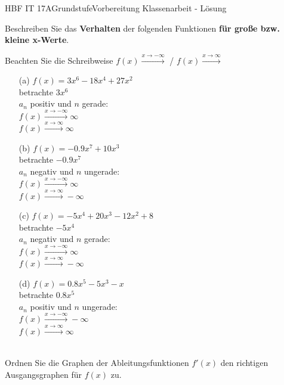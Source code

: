 \documentclass[oneside,openany,headings=optiontotoc,11pt,numbers=noenddot]{scrreprt}
\begin{document}
	\begin{worksheet}{HBF IT 17A}{Grundstufe}{Vorbereitung Klassenarbeit - Lösung}
		\begin{framed}
			\noindent\normalsize
			Beschreiben Sie das \textbf{Verhalten} der folgenden Funktionen \textbf{für große bzw. kleine x-Werte}.
			\begin{framed}
				Beachten Sie die Schreibweise \(f(x) \xrightarrow{x \rightarrow -\infty}\) / \(f(x) \xrightarrow{x \rightarrow \infty}\)
			\end{framed}
			\begin{itemize}
				\item[(a)] \(f(x) = 3x^6 -18x^4 +27x^2\)\\
				betrachte \(3x^6\)\\
				\(a_n\) positiv und \(n\) gerade:\\
				\(f(x) \xrightarrow{x \rightarrow -\infty} \infty\)\\
				\(f(x) \xrightarrow{x \rightarrow \infty} \infty\)
				\item[(b)] \(f(x) = -0.9x^7+10x^3\)\\
				betrachte \(-0.9x^7\)\\
				\(a_n\) negativ und \(n\) ungerade:\\
				\(f(x) \xrightarrow{x \rightarrow -\infty} \infty\)\\
				\(f(x) \xrightarrow{x \rightarrow \infty} -\infty\)
				\item[(c)] \(f(x) = -5x^4 +20x^3 -12x^2 +8\)\\
				betrachte \(-5x^4\)\\
				\(a_n\) negativ und \(n\) gerade:\\
				\(f(x) \xrightarrow{x \rightarrow -\infty} \infty\)\\
				\(f(x) \xrightarrow{x \rightarrow \infty} -\infty\)
				\item[(d)] \(f(x) = 0.8x^5-5x^3-x\)\\
				betrachte \(0.8x^5\)\\
				\(a_n\) positiv und \(n\) ungerade:\\
				\(f(x) \xrightarrow{x \rightarrow -\infty} -\infty\)\\
				\(f(x) \xrightarrow{x \rightarrow \infty} \infty\)
			\end{itemize}
			\hdashrule[0.5ex][x]{\textwidth}{0.1mm}{8mm 2pt}\\
			\newpage
			Ordnen Sie die Graphen der Ableitungsfunktionen \(f'(x)\) den richtigen Ausgangsgraphen für \(f(x)\) zu.\\

\end{framed}
\end{worksheet}
\end{document}

